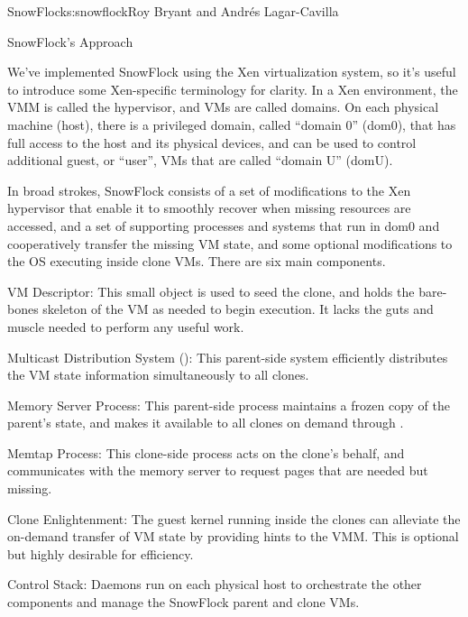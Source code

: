 \begin{aosachapter}{SnowFlock}{s:snowflock}{Roy Bryant and Andr\'e{s} Lagar-Cavilla}
\begin{aosasect1}{SnowFlock's Approach}
\begin{aosaitemize}
\end{aosaitemize}

We've implemented SnowFlock using the Xen virtualization system, so
it's useful to introduce some Xen-specific terminology for clarity. In
a Xen environment, the VMM is called the hypervisor, and VMs are
called domains. On each physical machine (host), there is a privileged
domain, called ``domain 0'' (dom0), that has full access to the host
and its physical devices, and can be used to control additional guest, or ``user'',
VMs that are called ``domain U'' (domU).

In broad strokes, SnowFlock consists of a set of modifications to the
Xen hypervisor that enable it to smoothly recover when missing
resources are accessed, and a set of supporting processes and systems
that run in dom0 and cooperatively transfer the missing VM state, and
some optional modifications to the OS executing inside clone
VMs. There are six main components.

\begin{aosaitemize}

  \item VM Descriptor: This small object is used to seed the clone,
  and holds the bare-bones skeleton of the VM as needed to begin
  execution.  It lacks the guts and muscle needed to perform any
  useful work.

  \item Multicast Distribution System (): This
  parent-side system efficiently distributes the VM state
  information simultaneously to all clones.

  \item Memory Server Process: This parent-side process maintains a
  frozen copy of the parent's state, and makes it available to all
  clones on demand through .

  \item Memtap Process: This clone-side process acts on the clone's
  behalf, and communicates with the memory server to request pages
  that are needed but missing.

  \item Clone Enlightenment: The guest kernel running inside the
  clones can alleviate the on-demand transfer of VM state by
  providing hints to the VMM\@. This is optional but highly desirable
  for efficiency.

  \item Control Stack: Daemons run on each physical host to
  orchestrate the other components and manage the SnowFlock parent and clone VMs.


\end{aosaitemize}
\end{aosasect1}
\end{aosachapter}
